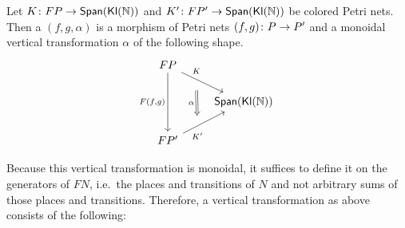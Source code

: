 \begin{defn}\label{morphism}
    Let $K \colon FP \to \mathsf{Span}(\mathsf{\mathsf{Kl}(\mathbb{N}) })$ and $K' \colon FP' \to \mathsf{Span}(\mathsf{\mathsf{Kl}(\mathbb{N}) })$ be colored Petri nets. Then a  $(f, g, \alpha)$ is a morphism of Petri nets $(f, g) \colon P \to P'$ and a monoidal vertical transformation $\alpha$ of the following shape.
    \[
    \begin{tikzcd}
        FP 
        \ar[dd, "{F(f, g)}", swap] 
        \ar[dr, "K"{name=U}, pos=0.2]
        &\\&  
        \Span(\FCMon)
        \\
        FP'
        \ar[ur, "K'"{name=D}, swap, pos=0.15]
        & 
        \arrow[Rightarrow, from = U, to = D, shorten <=3ex, shorten >=3ex, "\alpha", swap]
    \end{tikzcd}
    \]
\end{defn}
\noindent Because this vertical transformation is monoidal, it suffices to define it on the generators of $FN$, i.e.\ the places and transitions of $N$ and not arbitrary sums of those places and transitions. Therefore, a vertical transformation as above consists of the following:
